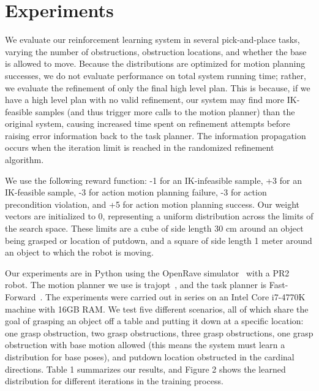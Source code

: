\section{Experiments}
We evaluate our reinforcement learning system in several pick-and-place
tasks, varying the number of obstructions, obstruction locations, and whether
the base is allowed to move. Because the distributions are optimized for
motion planning successes, we do not evaluate performance on total system
running time; rather, we evaluate the refinement of only the final high level
plan. This is because, if we have a high level plan with no valid refinement,
our system may find more IK-feasible samples (and thus trigger more calls to
the motion planner) than the original system, causing increased time spent
on refinement attempts before raising error information back to the task planner.
The information propagation occurs when the iteration limit is reached in
the randomized refinement algorithm.

We use the following reward function: -1 for an IK-infeasible sample, +3 for
an IK-feasible sample, -3 for action motion planning failure, -3 for action
precondition violation, and +5 for action motion planning success. Our weight
vectors are initialized to 0, representing a uniform distribution across
the limits of the search space. These limits are a cube of side length 30 cm
around an object being grasped or location of putdown, and a square of side
length 1 meter around an object to which the robot is moving.

Our experiments are in Python using the OpenRave simulator~\cite{Diankov_2008_6117} with a PR2 robot.
The motion planner we use is trajopt~\cite{schulman2013finding}, and the task planner is Fast-Forward~\cite{FF}.
The experiments were carried out in series on an Intel Core i7-4770K machine
with 16GB RAM. We test five different scenarios, all of which share the goal
of grasping an object off a table and putting it down at a specific location:
one grasp obstruction, two grasp obstructions, three grasp obstructions,
one grasp obstruction with base motion allowed (this means the system must learn
a distribution for base poses), and putdown location obstructed in the cardinal
directions. Table 1 summarizes our results, and Figure 2 shows the learned distribution
for different iterations in the training process.